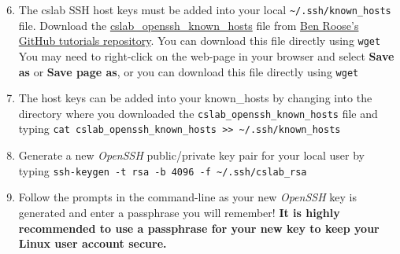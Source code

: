 \documentclass[12pt]{article}
\begin{document}
\begin{flushleft}
\begin{enumerate}
  \setcounter{enumi}{5}
  \item The cslab SSH host keys must be added into your local \verb|~/.ssh/known_hosts| file. Download the \href{https://raw.githubusercontent.com/benroose/tutorials/master/cslab_tutorials/cslab_ssh_client_config_files/cslab_openssh_known_hosts}{cslab\_openssh\_known\_hosts} file from \href{https://github.com/benroose/tutorials/tree/master/cslab_tutorials/}{Ben Roose's GitHub tutorials repository}. You can download this file directly using \verb|wget| You may need to right-click on the web-page in your browser and select \textbf{Save as} or \textbf{Save page as}, or you can download this file directly using \verb|wget|
  \item The host keys can be added into your known\_hosts by changing into the directory where you downloaded the \verb|cslab_openssh_known_hosts| file and typing \break
    \verb|cat cslab_openssh_known_hosts >> ~/.ssh/known_hosts|
  \item Generate a new \textit{OpenSSH} public/private key pair for your local user by typing \break
    \verb|ssh-keygen -t rsa -b 4096 -f ~/.ssh/cslab_rsa|
  \item Follow the prompts in the command-line as your new \textit{OpenSSH} key is generated and enter a passphrase you will remember! \break
  \textbf{It is highly recommended to use a passphrase for your new key to keep your Linux user account secure.}
  

\end{enumerate}
\end{flushleft}
\end{document}

